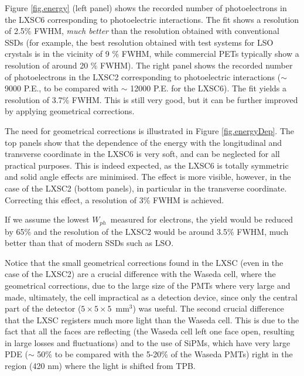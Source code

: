 \documentclass{JINST}
\begin{document}
Figure \ref{fig.energy} (left panel) shows the recorded number of photoelectrons in the LXSC6 corresponding to photoelectric interactions. The fit shows a resolution of 2.5\% FWHM, {\em much better} than the resolution obtained with conventional SSDs (for example, the best resolution obtained with test systems for LSO crystals is in the vicinity of 9 \% FWHM, while commercial PETs typically show a resolution of around 20 \% FWHM). The right panel shows the recorded number of photoelectrons in the LXSC2 corresponding to photoelectric interactions ($\sim$ 9000 P.E., to be compared with $\sim$ 12000 P.E. for the LXSC6). The  fit yields a resolution of 3.7\% FWHM. This is still very good, but it can be further improved by applying geometrical corrections.

The need for geometrical corrections is illustrated in Figure \ref{fig.energyDep}. The top panels show that the dependence of the energy with the longitudinal and transverse coordinate in the LXSC6 is very soft, and can be neglected for all practical purposes. This is indeed expected, as the LXSC6 is totally symmetric and solid angle effects are minimised. The effect is more visible, however, in the case of the LXSC2 (bottom panels), in particular in the transverse coordinate. Correcting this effect, a resolution of 3\% FWHM is achieved. 

If we assume the lowest $W_{ph}$~measured for electrons, the yield would be reduced by 65\% and the resolution of the LXSC2 would be around 3.5\% FWHM, much better than that of modern SSDs such as LSO. 

Notice that the small geometrical corrections found in the LXSC (even in the case of the LXSC2) are a crucial difference with the Waseda cell, where the geometrical corrections, due to the large size of the PMTs where very large and made, ultimately, the cell impractical as a detection device, since only the central part of the detector ($5 \times 5 \times 5$~mm$^3$) was useful. The second crucial difference that the LXSC registers much more light than the Waseda cell. This is due to the fact that all the faces are reflecting (the Waseda cell left one face open, resulting in large losses and fluctuations) and to the use of SiPMs, which have very large PDE ($\sim$ 50\% to be compared with the 5-20\% of the Waseda PMTs) right in the region (420 nm) where the light is shifted from TPB. 


\end{document}
